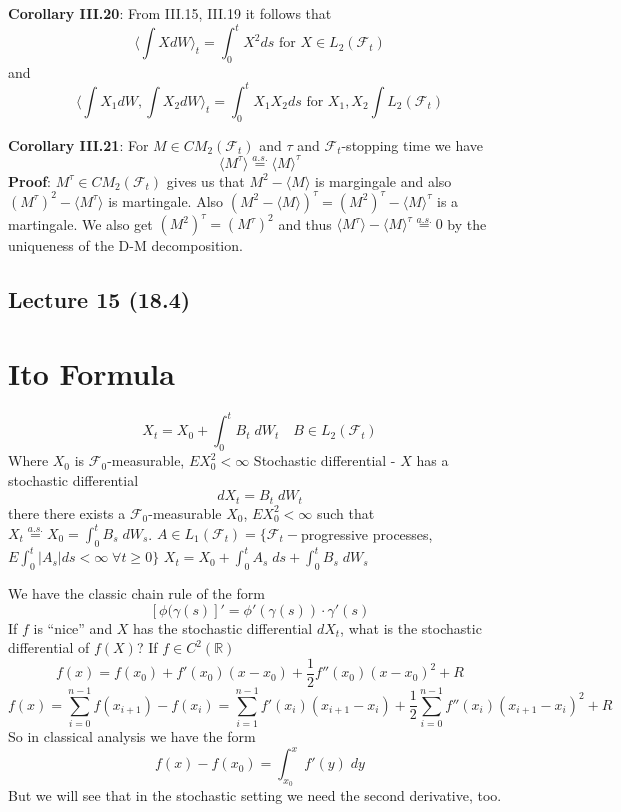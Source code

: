 \documentclass[english]{article}
\newcommand{\R}{\mathbb{R}}
\newcommand{\note}[1]{\noindent\textbf{#1}}
\newcommand{\F}{\mathcal F}
\newcommand{\as}[1]{\stackrel {a.s.}{#1}}
\newcommand{\covar}[1]{\langle {#1} \rangle }
\begin{document}
\note{Corollary III.20}:  From III.15, III.19 it follows that 
$$\covar {\int X dW}_t = \int^t_0 X^2 ds \text{ for } X \in L_2(\F_t)$$
and
$$\covar {\int X_1 dW, \int X_2 dW}_t = \int^t_0 X_1 X_2 ds \text{ for } X_1, X_2 \int L_2(\F_t)$$

\note{Corollary III.21}: For $M \in CM_2(\F_t)$ and $\tau$ and $\F_t$-stopping time we have
$$\covar {M^\tau} \as= \covar M^\tau $$
\note{Proof}: $M^\tau \in CM_2(\F_t)$ gives us that $M^2 - \covar M$ is margingale and also $(M^\tau)^2 - \covar {M^\tau}$ is martingale. Also $(M^2 - \covar M)^\tau = (M^2)^\tau - \covar M^\tau$ is a martingale. We also get $(M^2)^\tau = (M^\tau)^2$ and thus $\covar {M^\tau} - \covar M^\tau \as = 0$ by the uniqueness of the D-M decomposition.

\subsection*{Lecture 15 (18.4)}
\section{ Ito Formula}
$$X_t = X_0 + \int^t_0 B_t \; dW_t \quad B \in L_2(\F_t)$$
Where $X_0$ is $\F_0$-measurable, $EX^2_0< \infty$ \newline
Stochastic differential - $X$ has a stochastic differential 
$$dX_t = B_t \; dW_t$$
there there exists a $\F_0$-measurable $X_0$, $EX^2_0 < \infty$ such that $X_t \as = X_0 = \int^t_0 B_s \; dW_s$. \newline
$A \in L_1(\F_t) = \{ \F_t-$progressive processes, $E\int^t_0 |A_s| ds < \infty \; \forall t \geq 0 \}$ \newline
$X_t = X_0 + \int^t_0 A_s \; ds + \int^t_0 B_s \; dW_s$ \newline

We have the classic chain rule of the form
$$[\phi(\gamma(s)]' = \phi'(\gamma(s)) \cdot \gamma'(s)$$
If $f$ is ``nice'' and $X$ has the stochastic differential $dX_t$, what is the stochastic differential of $f(X)$? \newline
If $f\in C^2(\R)$
$$f(x) = f(x_0) + f'(x_0) (x-x_0) + \frac 12 f''(x_0) (x-x_0)^2 + R$$
$$f(x) = \sum^{n-1}_{i=0} f(x_{i+1}) - f(x_i) = \sum^{n-1}_{i=1} f'(x_i) (x_{i+1} - x_i) + \frac 12 \sum^{n-1}_{i=0}f''(x_i)(x_{i+1} - x_i)^2 + R$$
So in classical analysis we have the form
$$f(x) - f(x_0) = \int^x_{x_0} f'(y) \; dy$$
But we will see that in the stochastic setting we need the second derivative, too. \newline
\end{document}
